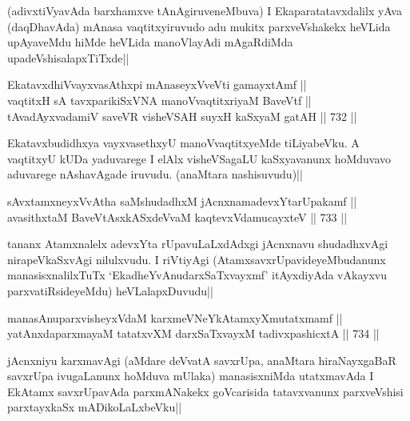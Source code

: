 \begin{artha} 
(adivxtiVyavAda barxhamxve tAnAgiruveneMbuva) I Ekaparatatavxdalilx 
yAva (daqDhavAda) mAnasa vaqtitxyiruvudo adu mukitx parxveVshakekx 
heVLida upAyaveMdu hiMde heVLida manoVlayAdi mAgaRdiMda 
upadeVshisalapxTiTxde||
\end{artha}


\begin{shl}
EkatavxdhiVvayxvasAthx\s pi mAnaseyxVveVti gamayxtAmf ||  \\
vaqtitxH sA tavxparikiSxVNA manoVvaqtitxriyaM BaveVtf || \\
tAvadAyxvadamiV saveVR visheVSAH suyxH kaSxyaM gatAH ||  732 ||  
\end{shl}

\begin{artha} 
Ekatavxbudidhxya vayxvasethxyU manoVvaqtitxyeMde tiLiyabeVku. A 
vaqtitxyU kUDa yaduvarege I elAlx visheVSagaLU kaSxyavanunx hoMduvavo 
aduvarege nAshavAgade iruvudu. (anaMtara nashisuvudu)||
\end{artha}


\begin{shl}
sAvxtamxneyxVvAtha saMshudadhxM jAcnxnamadevxYtarUpakamf || \\
avasithxtaM BaveVtAsxkASxdeVvaM kaqtevxVdamucayxteV ||  733 ||  
\end{shl}

\begin{artha} 
tananx Atamxnalelx adevxYta rUpavuLaLxdAdxgi jAcnxnavu shudadhxvAgi 
nirapeVkaSxvAgi nilulxvudu. I riVtiyAgi (AtamxsavxrUpavideyeMbudanunx 
manasisxnalilxTuTx `EkadheYvAnudarxSaTxvayxmf' itAyxdiyAda vAkayxvu 
parxvatiRsideyeMdu) heVLalapxDuvudu||
\end{artha}


\begin{shl}
manasA\s nuparxvisheyxVdaM karxmeVNeYkAtamxyXmutatxmamf || \\
yatAnxdaparxmayaM tatatxvXM darxSaTxvayxM tadivxpashicxtA ||  734 ||  
\end{shl}

\begin{artha} 
jAcnxniyu karxmavAgi (aMdare deVvatA savxrUpa, anaMtara hiraNayxgaBaR 
savxrUpa ivugaLanunx hoMduva mUlaka) manasisxniMda utatxmavAda I 
EkAtamx savxrUpavAda parxmANakekx goVcarisida tatavxvanunx 
parxveVshisi parxtayxkaSx mADikoLaLxbeVku||
\end{artha}

